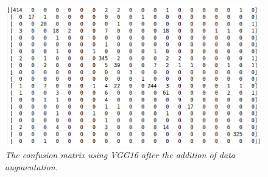 \documentclass[12pt,a4paper]{report}
\begin{document}
\begin{figure}[H]
\centering
\includegraphics[scale=0.4]{./immagini/vgg16/2_data_augmentation_-_30_epochs_no_stopping_-_no_dropout_-_no_batch_norm/cm_num.png}
\caption{\textit{The confusion matrix using VGG16 after the addition of data augmentation.}}
\end{figure}
\end{document}
